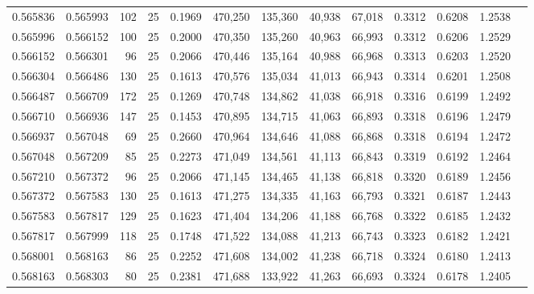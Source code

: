\begin{tabular}{rrrrrrrrrrrrr}
0.565836 & 0.565993 &   102 &  25 &                                     0.1969 & 470,250 & 135,360 &  40,938 &  67,018 & 0.3312 & 0.6208 & 1.2538 \\
0.565996 & 0.566152 &   100 &  25 &                                     0.2000 & 470,350 & 135,260 &  40,963 &  66,993 & 0.3312 & 0.6206 & 1.2529 \\
0.566152 & 0.566301 &    96 &  25 &                                     0.2066 & 470,446 & 135,164 &  40,988 &  66,968 & 0.3313 & 0.6203 & 1.2520 \\
0.566304 & 0.566486 &   130 &  25 &                                     0.1613 & 470,576 & 135,034 &  41,013 &  66,943 & 0.3314 & 0.6201 & 1.2508 \\
0.566487 & 0.566709 &   172 &  25 &                                     0.1269 & 470,748 & 134,862 &  41,038 &  66,918 & 0.3316 & 0.6199 & 1.2492 \\
0.566710 & 0.566936 &   147 &  25 &                                     0.1453 & 470,895 & 134,715 &  41,063 &  66,893 & 0.3318 & 0.6196 & 1.2479 \\
0.566937 & 0.567048 &    69 &  25 &                                     0.2660 & 470,964 & 134,646 &  41,088 &  66,868 & 0.3318 & 0.6194 & 1.2472 \\
0.567048 & 0.567209 &    85 &  25 &                                     0.2273 & 471,049 & 134,561 &  41,113 &  66,843 & 0.3319 & 0.6192 & 1.2464 \\
0.567210 & 0.567372 &    96 &  25 &                                     0.2066 & 471,145 & 134,465 &  41,138 &  66,818 & 0.3320 & 0.6189 & 1.2456 \\
0.567372 & 0.567583 &   130 &  25 &                                     0.1613 & 471,275 & 134,335 &  41,163 &  66,793 & 0.3321 & 0.6187 & 1.2443 \\
0.567583 & 0.567817 &   129 &  25 &                                     0.1623 & 471,404 & 134,206 &  41,188 &  66,768 & 0.3322 & 0.6185 & 1.2432 \\
0.567817 & 0.567999 &   118 &  25 &                                     0.1748 & 471,522 & 134,088 &  41,213 &  66,743 & 0.3323 & 0.6182 & 1.2421 \\
0.568001 & 0.568163 &    86 &  25 &                                     0.2252 & 471,608 & 134,002 &  41,238 &  66,718 & 0.3324 & 0.6180 & 1.2413 \\
0.568163 & 0.568303 &    80 &  25 &                                     0.2381 & 471,688 & 133,922 &  41,263 &  66,693 & 0.3324 & 0.6178 & 1.2405 \\

\end{tabular}
